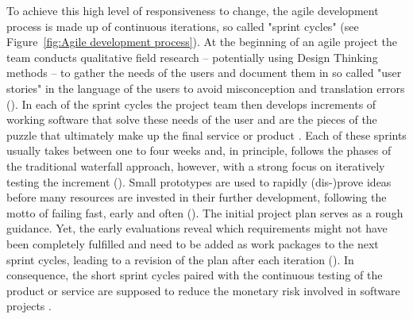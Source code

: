 To achieve this high level of responsiveness to change, the agile development process is made up of continuous iterations, so called "sprint cycles" (see Figure~\ref{fig:Agile development process}). At the beginning of an agile project the team conducts qualitative field research – potentially using Design Thinking methods – to gather the needs of the users and document them in so called "user stories" in the language of the users to avoid misconception and translation errors (\cite{Wirdemann2017, Mergel2016}). In each of the sprint cycles the project team then develops increments of working software that solve these needs of the user and are the pieces of the puzzle that ultimately make up the final service or product \parencite{Schwaber2020}. Each of these sprints usually takes between one to four weeks and, in principle, follows the phases of the traditional waterfall approach, however, with a strong focus on iteratively testing the increment (\cite{Schwaber2020, Hughes2013}). Small prototypes are used to rapidly (dis-)prove ideas before many resources are invested in their further development, following the motto of failing fast, early and often (\cite{Mergel2016, Boehmer2017}). The initial project plan serves as a rough guidance. Yet, the early evaluations reveal which requirements might not have been completely fulfilled and need to be added as work packages to the next sprint cycles, leading to a revision of the plan after each iteration (\cite{Mergel2016}). In consequence, the short sprint cycles paired with the continuous testing of the product or service are supposed to reduce the monetary risk involved in software projects \parencite{Schwaber2020}.

